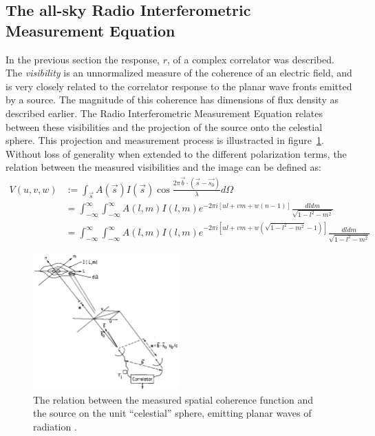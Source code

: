 \documentclass[a4paper,10pt]{report}
\begin{document}
\subsection{The all-sky Radio Interferometric Measurement Equation}
In the previous section the response, $r$, of a complex correlator was described. The \textit{visibility} is an unnormalized measure of the coherence of an electric field, and is very closely related to the correlator response to the planar wave fronts emitted
by a source. The magnitude of this coherence has dimensions of flux density as described earlier. The Radio Interferometric Measurement Equation relates between these visibilities and the projection of the source onto the celestial sphere. This projection and measurement
process is illustracted in figure~\ref{fig_uvw_lmn}. Without loss of generality when extended to the different polarization terms, the relation between the measured visibilities and the image can be defined as:
\begin{equation}
 \label{eqn_visibility}
 \begin{split}
  V(u,v,w) &:= \int_{\vec{s}}{A(\vec{s})I(\vec{s})\cos{\frac{2\pi\vec{b}\cdot(\vec{s}-\vec{s_0})}{\lambda}}d\Omega}\\
	   &= \int_{-\infty}^\infty{\int_{-\infty}^\infty{A(l,m)I(l,m)e^{-2\pi i[ul+vm+w(n-1)]} \frac{dldm}{\sqrt{1-l^2-m^2}}}}\\
	   &= \int_{-\infty}^\infty{\int_{-\infty}^\infty{A(l,m)I(l,m)e^{-2\pi i[ul+vm+w(\sqrt{1-l^2-m^2}-1)]} \frac{dldm}{\sqrt{1-l^2-m^2}}}}
 \end{split}
\end{equation}

\begin{figure}[h]
 \begin{mdframed}
 \centering
 \includegraphics[width=0.5\textwidth]{images/lmn_uvw.png}
 \caption[The relation between image space and visibilities]{The relation between the measured spatial coherence function and the source on the unit ``celestial'' sphere, emitting planar waves of radiation \cite{taylor1999synthesis}.}
  \label{fig_uvw_lmn}
 \end{mdframed}
\end{figure}
\end{document}

